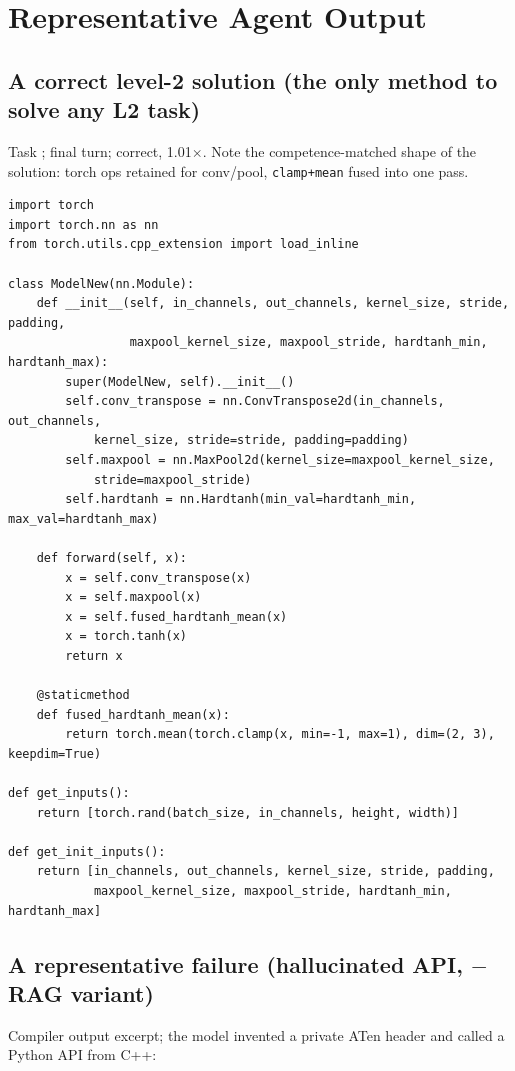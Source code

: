 \documentclass[conference]{IEEEtran}
\begin{document}
\section{Representative Agent Output}

\subsection{A correct level-2 solution (the only method to solve any L2 task)}
Task ; final turn;
correct, 1.01$\times$. Note the competence-matched shape of the solution: torch ops
retained for conv/pool, \texttt{clamp+mean} fused into one pass.

\begin{lstlisting}
import torch
import torch.nn as nn
from torch.utils.cpp_extension import load_inline

class ModelNew(nn.Module):
    def __init__(self, in_channels, out_channels, kernel_size, stride, padding,
                 maxpool_kernel_size, maxpool_stride, hardtanh_min, hardtanh_max):
        super(ModelNew, self).__init__()
        self.conv_transpose = nn.ConvTranspose2d(in_channels, out_channels,
            kernel_size, stride=stride, padding=padding)
        self.maxpool = nn.MaxPool2d(kernel_size=maxpool_kernel_size,
            stride=maxpool_stride)
        self.hardtanh = nn.Hardtanh(min_val=hardtanh_min, max_val=hardtanh_max)

    def forward(self, x):
        x = self.conv_transpose(x)
        x = self.maxpool(x)
        x = self.fused_hardtanh_mean(x)
        x = torch.tanh(x)
        return x

    @staticmethod
    def fused_hardtanh_mean(x):
        return torch.mean(torch.clamp(x, min=-1, max=1), dim=(2, 3), keepdim=True)

def get_inputs():
    return [torch.rand(batch_size, in_channels, height, width)]

def get_init_inputs():
    return [in_channels, out_channels, kernel_size, stride, padding,
            maxpool_kernel_size, maxpool_stride, hardtanh_min, hardtanh_max]
\end{lstlisting}

\subsection{A representative failure (hallucinated API, $-$RAG variant)}
Compiler output excerpt; the model invented a private ATen header and called a
Python API from C++:
\end{document}
